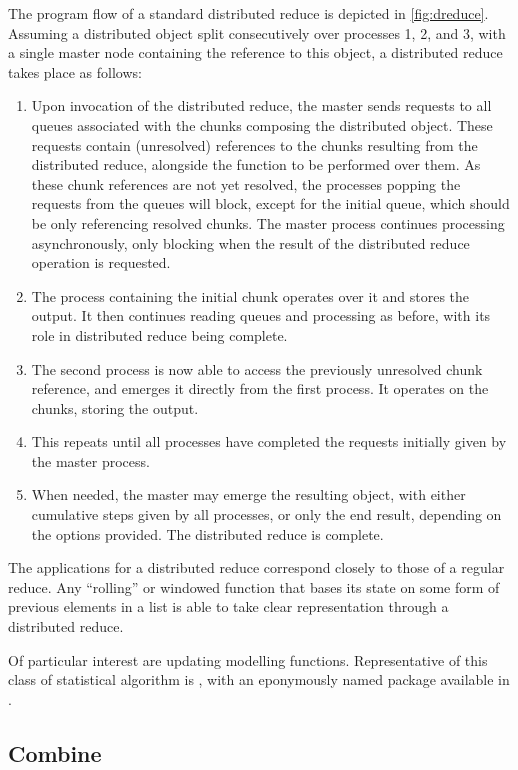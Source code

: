 The program flow of a standard distributed reduce is depicted in \cref{fig:dreduce}.
Assuming a distributed object split consecutively over processes 1, 2, and 3, with a single master node containing the reference to this object, a distributed reduce takes place as follows:
\begin{enumerate}
	\item Upon invocation of the distributed reduce, the master sends requests to all queues associated with the chunks composing the distributed object. These requests contain (unresolved) references to the chunks resulting from the distributed reduce, alongside the function to be performed over them. As these chunk references are not yet resolved, the processes popping the requests from the queues will block, except for the initial queue, which should be only referencing resolved chunks. The master process continues processing asynchronously, only blocking when the result of the distributed reduce operation is requested.
	\item The process containing the initial chunk operates over it and stores the output. It then continues reading queues and processing as before, with its role in distributed reduce being complete.
	\item The second process is now able to access the previously unresolved chunk reference, and emerges it directly from the first process. It operates on the chunks, storing the output.
	\item This repeats until all processes have completed the requests initially given by the master process.
	\item When needed, the master may emerge the resulting object, with either cumulative steps given by all processes, or only the end result, depending on the options provided. The distributed reduce is complete.
\end{enumerate}

The applications for a distributed reduce correspond closely to those of a regular reduce.
Any ``rolling'' or windowed function that bases its state on some form of previous elements in a list is able to take clear representation through a distributed reduce.

Of particular interest are updating modelling functions.
Representative of this class of statistical algorithm is , with an eponymously named package available in \R{}.

\subsection{Combine}\label{sec:combine}

